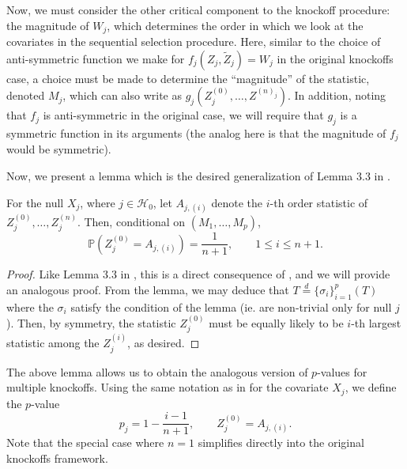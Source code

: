 \documentclass[11pt,reqno]{report}
\theoremstyle{definition}
\numberwithin{equation}{section}
\begin{document}
Now, we must consider the other critical component to the knockoff procedure: the magnitude of $W_j$, which determines the order in which we look at the covariates in the sequential selection procedure. Here, similar to the choice of anti-symmetric function we make for $f_j(Z_j, \tilde{Z}_j) = W_j$ in the original knockoffs case, a choice must be made to determine the ``magnitude'' of the statistic, denoted $M_j$, which can also write as $g_j(Z^{(0)}_j,\ldots, Z^{(n)_j})$. In addition, noting that $f_j$ is anti-symmetric in the original case, we will require that $g_j$ is a symmetric function in its arguments (the analog here is that the magnitude of $f_j$ would be symmetric). 


Now, we present a lemma which is the desired generalization of Lemma 3.3 in \cite{panning}.
\begin{lem}
\label{lemma2.4}
For the null $X_j$, where $j \in \mathcal{H}_0$, let $A_{j, (i)}$ denote the $i$-th order statistic of $Z_j^{(0)}, \ldots, Z_j^{(n)}$. Then, conditional on $(M_1, \ldots, M_p)$,
\begin{equation}
\mathbb{P}\left(Z_j^{(0)} = A_{j, (i)} \right) = \frac{1}{n+1}, \qquad 1 \leq i \leq n + 1.
\end{equation}
\end{lem}
\begin{proof}
Like Lemma 3.3 in \cite{panning}, this is a direct consequence of \hyperref[lemma2.3]{}, and we will provide an analogous proof. From the lemma, we may deduce that $T \overset{d}{=} \{ \sigma_i \}_{i=1}^p \left( T \right)$ where the $\sigma_i$ satisfy the condition of the lemma (ie. are non-trivial only for null $j$). Then, by symmetry, the statistic $Z_j^{(0)}$ must be equally likely to be $i$-th largest statistic among the $Z_j^{(i)}$, as desired.
\end{proof}
The above lemma allows us to obtain the analogous version of $p$-values for multiple knockoffs. Using the same notation as in \hyperref[lemma2.4]{} for the covariate $X_j$, we define the $p$-value
\begin{equation}
p_j = 1 - \frac{i - 1}{n+1}, \qquad Z_j^{(0)} = A_{j, (i)}.
\end{equation}
Note that the special case where $n = 1$ simplifies directly into the original knockoffs framework.
\end{document}
